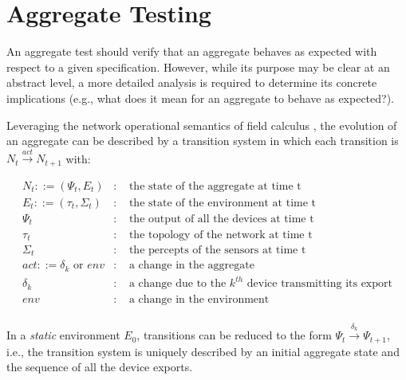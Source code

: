 \section{Aggregate Testing}
\label{section:analysis:aggregate-testing}

An aggregate test should verify that an aggregate behaves as expected with
respect to a given specification. However, while its purpose may be clear at an
abstract level, a more detailed analysis is required to determine its concrete
implications (e.g., what does it mean for an aggregate to behave as expected?).

Leveraging the network operational semantics of field calculus
\cite{CAS-AggregateComputingBlocks}, the evolution of an aggregate can be
described by a transition system in which each transition is $N_{t}
\xrightarrow{act} N_{t+1}$ with:

\begin{align*}
   & N_t::=(\Psi_t, E_t)                & : & \textrm{ the state of the aggregate at time t}                                 & \\
   & E_t::=(\tau_t, \Sigma_t)           & : & \textrm{ the state of the environment at time t}                               & \\
   & \Psi_t                             & : & \textrm{ the output of all the devices at time t}                              & \\
   & \tau_t                             & : & \textrm{ the topology of the network at time t}                                & \\
   & \Sigma_t                           & : & \textrm{ the percepts of the sensors at time t}                                & \\
   & act::=\delta_{k} \textrm{ or } env & : & \textrm{ a change in the aggregate}                                            & \\
   & \delta_{k}                         & : & \textrm{ a change due to the } k^{th} \textrm{ device transmitting its export} & \\
   & env                                & : & \textrm{ a change in the environment}                                          & \\
\end{align*}

In a \textit{static} environment $E_0$, transitions can be reduced to the form
$\Psi_{t} \xrightarrow{\delta_{k}} \Psi_{t+1}$, i.e., the transition system is
uniquely described by an initial aggregate state and the sequence of all the
device exports.

